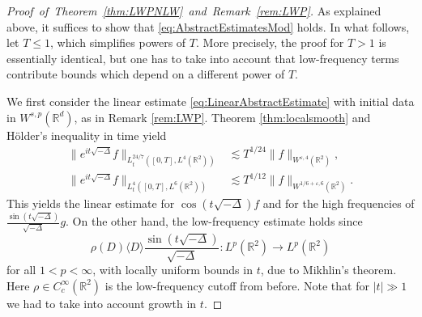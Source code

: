 \documentclass{amsart}
\theoremstyle{definition}
\newcommand{\R}{\mathbb{R}}
\newcommand {\Rd}{\mathbb{R}^{d}}
\newcommand {\rb}{\rangle}
\newcommand {\lb}{{\langle}}
\newcommand {\veps}{\varepsilon}
\numberwithin{equation}{section}
\begin{document}
\begin{proof}[Proof~of~Theorem~\ref{thm:LWPNLW}~and~Remark~\ref{rem:LWP}]
As explained above, it suffices to show that \eqref{eq:AbstractEstimatesMod} holds. In what follows, let $T \leq 1$, which simplifies powers of $T$. More precisely, the proof for $T>1$ is essentially identical, but one has to take into account that low-frequency terms contribute bounds which depend on a different power of $T$. 

We first consider the linear estimate \eqref{eq:LinearAbstractEstimate} with initial data in $W^{s,p}(\Rd)$, as in Remark \ref{rem:LWP}. Theorem \ref{thm:localsmooth} and H\"{o}lder's inequality in time yield
\begin{align*}
\| e^{it \sqrt{- \Delta}} f \|_{L_t^{24/7}([0,T],L^4(\R^2))} &\lesssim T^{1/24} \| f \|_{W^{\veps,4}(\R^2)},\\
\| e^{it \sqrt{- \Delta}} f \|_{L_t^4([0,T],L^6(\R^2))} &\lesssim T^{1/12} \| f \|_{W^{1/6+\varepsilon,6}(\R^2)}.
\end{align*}
This yields the linear estimate for $\cos(t \sqrt{- \Delta}) f$ and for the high frequencies of $\frac{\sin (t \sqrt{- \Delta})}{\sqrt{- \Delta}}g$. On the other hand, the low-frequency estimate holds since
\begin{equation}\label{eq:Mikhlin}
\rho(D) \lb D\rb \frac{\sin (t \sqrt{- \Delta})}{\sqrt{- \Delta}}: L^p(\R^{2}) \to L^p(\R^{2})
\end{equation}
for all $1<p<\infty$, with locally uniform bounds in $t$, due to Mikhlin's theorem. Here $\rho\in C^{\infty}_{c}(\R^{2})$ is the low-frequency cutoff from before. Note that for $|t| \gg 1$ we had to take into account growth in $t$.


\end{proof}
\end{document}
